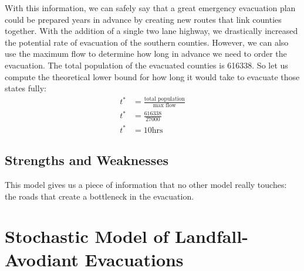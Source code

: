 \documentclass[titlepage]{article}
\begin{document}
    With this information, we can safely say that a great emergency evacuation plan could be prepared years in advance by creating new routes that link counties together. With the addition of a single two lane highway, we drastically increased the potential rate of evacuation of the southern counties. However, we can also use the maximum flow to determine how long in advance we need to order the evacuation.
    The total population of the evacuated counties is 616338. So let us compute the theoretical lower bound for how long it would take to evacuate those states fully:
    \begin{align*}
        t^* &= \frac{\text{total population}}{\text{max flow}}\\
        t^* &= \frac{616338}{27000}\\
        t^* &= 10 \text{hrs}
    \end{align*}
  \subsection{Strengths and Weaknesses}
    This model gives us a piece of information that no other model really touches: the roads that create a bottleneck in the evacuation. 

\section{Stochastic Model of Landfall-Avodiant Evacuations}
\label{sec:stochastic}
\end{document}
